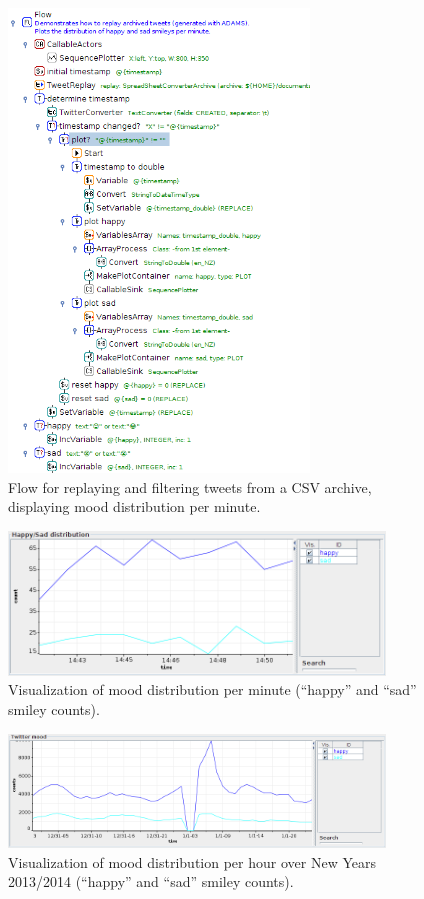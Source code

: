 \documentclass[a4paper,10pt]{book}
\begin{document}
\begin{figure}[htb]
  \centering
  \includegraphics[width=8.0cm]{images/replay_and_filter_tweets2-flow.png}
  \caption{Flow for replaying and filtering tweets from a CSV archive, displaying mood distribution per minute.}
  \label{replay_and_filter_tweets2-flow}
\end{figure}

\begin{figure}[htb]
  \centering
  \includegraphics[width=10.0cm]{images/replay_and_filter_tweets2-output.png}
  \caption{Visualization of mood distribution per minute (``happy'' and ``sad'' smiley counts).}
  \label{replay_and_filter_tweets2-output}
\end{figure}

\begin{figure}[htb]
  \centering
  \includegraphics[width=10.0cm]{images/twitter_mood.png}
  \caption{Visualization of mood distribution per hour over New Years 2013/2014 (``happy'' and ``sad'' smiley counts).}
  \label{twitter_mood}
\end{figure}
\end{document}
